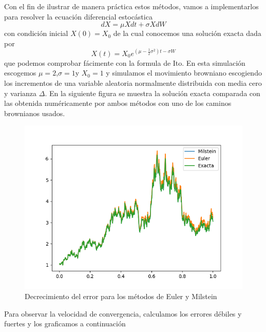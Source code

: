 \documentclass{article}
\begin{document}
\noindent
Con el fin de ilustrar de manera práctica estos métodos, vamos a implementarlos para resolver la ecuación diferencial estocástica
\begin{equation}
    dX=\mu Xdt+\sigma X dW
\end{equation}
con condición inicial $X(0)=X_0$
\nocite{*}
de la cual conocemos una solución exacta dada por 
\begin{equation}
    X(t)=X_0 e^{(\mu-\frac{1}{2}\sigma^2)t-\sigma W}
\end{equation}
que podemos comprobar fácimente con la formula de Ito. En esta simulación escogemos $\mu=2$,$\sigma=1$y $X_0=1$ y simulamos el movimiento browniano escogiendo los incrementos de una variable aleatoria normalmente distribuida con media cero y varianza $\Delta$. En la siguiente figura se muestra la solución exacta comparada con las obtenida numéricamente por ambos métodos con uno de los caminos brownianos usados.
\begin{figure}[H]
    \centering
    \includegraphics[width=\textwidth]{browniano.png}
    \caption{Decrecimiento del error para los métodos de Euler y Milstein}
    \label{fig:my_label}
\end{figure}
\noindent
Para observar la velocidad de convergencia, calculamos los errores débiles y fuertes y los graficamos a continuación 
\end{document}
